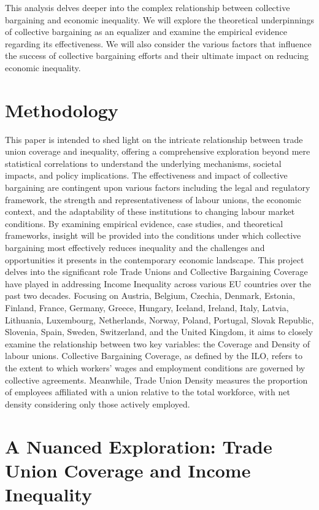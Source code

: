 \documentclass{article}
\begin{document}
This analysis delves deeper into the complex relationship between collective bargaining and economic inequality. We will explore the theoretical underpinnings of collective bargaining as an equalizer and examine the empirical evidence regarding its effectiveness. We will also consider the various factors that influence the success of collective bargaining efforts and their ultimate impact on reducing economic inequality.


\section{Methodology}

This paper is intended to shed light on the intricate relationship between trade union coverage and inequality, offering a comprehensive exploration beyond mere statistical correlations to understand the underlying mechanisms, societal impacts, and policy implications. The effectiveness and impact of collective bargaining are contingent upon various factors including the legal and regulatory framework, the strength and representativeness of labour unions, the economic context, and the adaptability of these institutions to changing labour market conditions. By examining empirical evidence, case studies, and theoretical frameworks, insight will be provided into the conditions under which collective bargaining most effectively reduces inequality and the challenges and opportunities it presents in the contemporary economic landscape. This project delves into the significant role Trade Unions and Collective Bargaining Coverage have played in addressing Income Inequality across various EU countries over the past two decades. Focusing on Austria, Belgium, Czechia, Denmark, Estonia, Finland, France, Germany, Greece, Hungary, Iceland, Ireland, Italy, Latvia, Lithuania, Luxembourg, Netherlands, Norway, Poland, Portugal, Slovak Republic, Slovenia, Spain, Sweden, Switzerland, and the United Kingdom, it aims to closely examine the relationship between two key variables: the Coverage and Density of labour unions. Collective Bargaining Coverage, as defined by the ILO, refers to the extent to which workers' wages and employment conditions are governed by collective agreements. Meanwhile, Trade Union Density measures the proportion of employees affiliated with a union relative to the total workforce, with net density considering only those actively employed.  

\newpage

\section{A Nuanced Exploration: Trade Union Coverage and Income Inequality}
\end{document}

